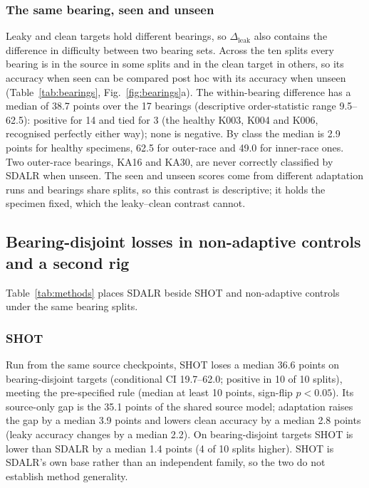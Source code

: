 \subsubsection{The same bearing, seen and unseen}

Leaky and clean targets hold different bearings, so $\Delta_{\mathrm{leak}}$ also
contains the difference in difficulty between two bearing sets. Across the ten splits every bearing is in the source in some
splits and in the clean target in others, so its accuracy when seen can be compared post hoc with its accuracy when unseen
(Table~\ref{tab:bearings}, Fig.~\ref{fig:bearings}a). The within-bearing difference has a median of 38.7 points over the 17
bearings (descriptive order-statistic range 9.5--62.5): positive for 14 and tied for 3 (the healthy K003, K004 and K006, recognised perfectly either way); none is
negative. By class the median is 2.9 points for healthy specimens, 62.5 for outer-race and 49.0 for inner-race ones. Two
outer-race bearings, KA16 and KA30, are never correctly classified by SDALR when unseen. The seen and unseen scores come from
different adaptation runs and bearings share splits, so this contrast is descriptive; it holds the specimen fixed, which
the leaky--clean contrast cannot.

\subsection{Bearing-disjoint losses in non-adaptive controls and a second rig}
\label{sec:res-second}



Table~\ref{tab:methods} places SDALR beside SHOT and non-adaptive controls under the same bearing splits.

\subsubsection{SHOT}

Run from the same source checkpoints, SHOT loses a median 36.6 points on bearing-disjoint targets (conditional CI 19.7--62.0; positive in 10 of 10 splits), meeting the pre-specified rule (median at least 10 points, sign-flip $p<0.05$). Its source-only gap is the 35.1 points of the shared source model; adaptation raises the gap by a median 3.9 points and lowers clean accuracy by a median 2.8 points (leaky accuracy changes by a median 2.2). On bearing-disjoint targets SHOT is lower than SDALR by a median 1.4 points (4 of 10 splits higher). SHOT is SDALR's own base rather than an independent family, so the two do not establish method generality.

